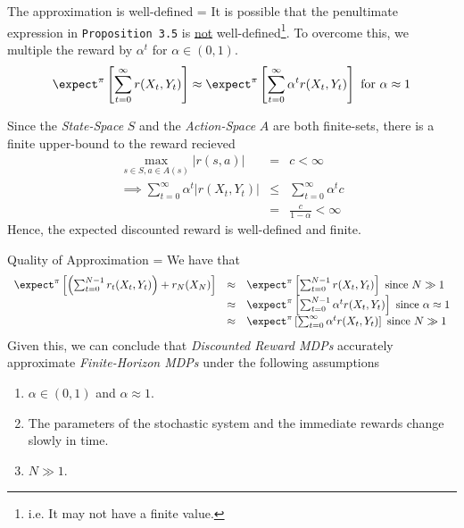 \documentclass[11pt,a4paper]{article}
\begin{document}
  \begin{remark}{The approximation is well-defined}
    \everymath={\displaystyle}
    It is possible that the penultimate expression in \texttt{Proposition 3.5} is \underline{not} well-defined\footnote{i.e. It may not have a finite value.}. To overcome this, we multiple the reward by $\alpha^t$ for $\alpha\in(0,1)$.
    \[ \expect^\pi\left[\sum_{t=0}^\infty r(X_t,Y_t)\right]\approx\expect^\pi\left[\sum_{t=0}^\infty\alpha^tr(X_t,Y_t)\right]\text{ for }\alpha\approx1 \]
    \par Since the \textit{State-Space} $S$ and the \textit{Action-Space} $A$ are both finite-sets, there is a finite upper-bound to the reward recieved
    \[\begin{array}{rcl}
      \max_{s\in S,a\in A(s)}|r(s,a)|&=&c<\infty\\
      \implies\sum_{t=0}^\infty\alpha^t|r(X_t,Y_t)|&\leq&\sum_{t=0}^\infty\alpha^tc\\
      &=&\frac{c}{1-\alpha}<\infty
    \end{array}\]
    Hence, the expected discounted reward is well-defined and finite.
  \end{remark}

  \begin{remark}{Quality of Approximation}
    \everymath={\displaystyle}
    We have that
    \[\begin{array}{rcl}
      \expect^\pi\left[\left(\sum_{t=0}^{N-1}r_t(X_t,Y_t)\right)+r_N(X_N)\right]&\approx&\expect^\pi\left[\sum_{t=0}^{N-1}r(X_t,Y_t)\right]\text{ since }N\gg1\\
      &\approx&\expect^\pi\left[\sum_{t=0}^{N-1}\alpha^tr(X_t,Y_t)\right]\text{ since }\alpha\approx1\\
      &\approx&\expect^\pi\left[\sum_{t=0}^\infty\alpha^tr(X_t,Y_t)\right]\text{ since }N\gg1
    \end{array}\]
    Given this, we can conclude that \textit{Discounted Reward MDPs} accurately approximate \textit{Finite-Horizon MDPs} under the following assumptions
    \begin{enumerate}
      \item $\alpha\in(0,1)$ and $\alpha\approx1$.
      \item The parameters of the stochastic system and the immediate rewards change slowly in time.
      \item $N\gg1$.
    \end{enumerate}
  \end{remark}
\end{document}
